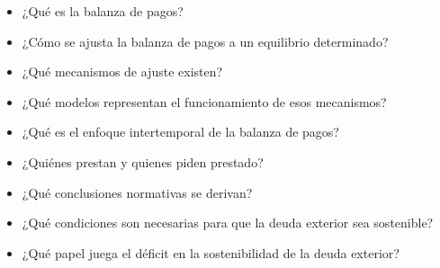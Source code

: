 \documentclass{nuevotema}
\begin{document}
\ideaclave

\begin{itemize}
	\item ¿Qué es la balanza de pagos?
	\item ¿Cómo se ajusta la balanza de pagos a un equilibrio determinado?
	\item ¿Qué mecanismos de ajuste existen?
	\item ¿Qué modelos representan el funcionamiento de esos mecanismos?
	\item ¿Qué es el enfoque intertemporal de la balanza de pagos?
	\item ¿Quiénes prestan y quienes piden prestado?
	\item ¿Qué conclusiones normativas se derivan?
	\item ¿Qué condiciones son necesarias para que la deuda exterior sea sostenible?
	\item ¿Qué papel juega el déficit en la sostenibilidad de la deuda exterior?
\end{itemize}

\esquemacorto
\end{document}
